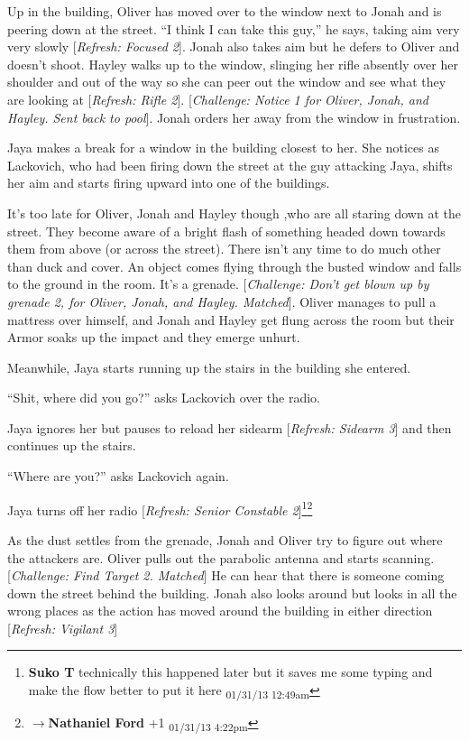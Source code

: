 Up in the building, Oliver has moved over to the window next to Jonah and is peering down at the street.  ``I think I can take this guy,'' he says, taking aim very very slowly {[}\textit{Refresh: Focused 2}{]}.  Jonah also takes aim but he defers to Oliver and doesn't shoot.  Hayley walks up to the window, slinging her rifle absently over her shoulder and out of the way so she can peer out the window and see what they are looking at {[}\textit{Refresh: Rifle 2}{]}.  {[}\textit{Challenge: Notice 1 for Oliver, Jonah, and Hayley. Sent back to pool}{]}.  Jonah orders her away from the window in frustration.



Jaya makes a break for a window in the building closest to her.  She notices as Lackovich, who had been firing down the street at the guy attacking Jaya, shifts her aim and starts firing upward into one of the buildings.



It's too late for Oliver, Jonah and Hayley though ,who are all staring down at the street. They become aware of a bright flash of something headed down towards them from above (or across the street).  There isn't any time to do much other than duck and cover.  An object comes flying through the busted window and falls to the ground in the room.  It's a grenade.  {[}\textit{Challenge: Don't get blown up by grenade 2, for Oliver, Jonah, and Hayley.  Matched}{]}.  Oliver manages to pull a mattress over himself, and Jonah and Hayley get flung across the room but their Armor soaks up the impact and they emerge unhurt.



Meanwhile, Jaya starts running up the stairs in the building she entered.

``Shit, where did you go?'' asks Lackovich over the radio. 

Jaya ignores her but pauses to reload her sidearm {[}\textit{Refresh: Sidearm 3}{]} and then continues up the stairs.

``Where are you?'' asks Lackovich again.

Jaya turns off her radio {[}\textit{Refresh: Senior Constable 2}{]}\footnote{\textbf{Suko T }technically this happened later but it saves me some typing and make the flow better to put it here \textsubscript{01/31/13 12:49am}}\footnote{$\rightarrow$\textbf{Nathaniel Ford }+1 \textsubscript{01/31/13 4:22pm}}



As the dust settles from the grenade, Jonah and Oliver try to figure out where the attackers are.  Oliver pulls out the parabolic antenna and starts scanning. {[}\textit{Challenge: Find Target 2.  Matched}{]}  He can hear that there is someone coming down the street behind the building.  Jonah also looks around but looks in all the wrong places as the action has moved around the building in either direction {[}\textit{Refresh: Vigilant 3}{]}



